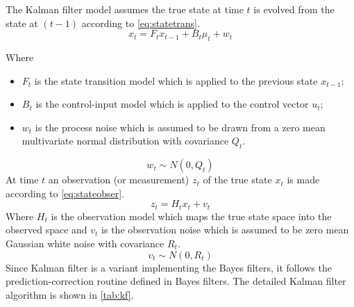 The Kalman filter model assumes the true state at time $t$ is evolved from the state at $(t-1)$ according to \autoref{eq:statetrans}.
\begin{equation}
\label{eq:statetrans}
x_t = F_tx_{t-1}+B_t\mu_t+w_t
\end{equation}

Where
\begin{itemize}
  \item $F_t$ is the state transition model which is applied to the previous state $x_{t-1}$;
  \item $B_t$ is the control-input model which is applied to the control vector $u_t$;
  \item $w_t$ is the process noise which is assumed to be drawn from a zero mean multivariate normal distribution with covariance $Q_t$.
\end{itemize}
\begin{equation}
\label{eq:Q}
w_t \sim N(0,Q_t)
\end{equation}
At time $t$ an observation (or measurement) $z_t$ of the true state $x_t$ is made according to \autoref{eq:stateobser}.
\begin{equation}
\label{eq:stateobser}
z_t = H_tx_t + v_t
\end{equation}
Where $H_t$ is the observation model which maps the true state space into the observed space and $v_t$ is the observation noise which is assumed to be zero mean Gaussian white noise with covariance $R_t$.
\begin{equation}
\label{eq:R}
v_t \sim N(0,R_t)
\end{equation}
Since Kalman filter is a variant implementing the Bayes filters, it follows the prediction-correction routine defined in Bayes filters. The detailed Kalman filter algorithm is shown in \autoref{tab:kf}. \\

